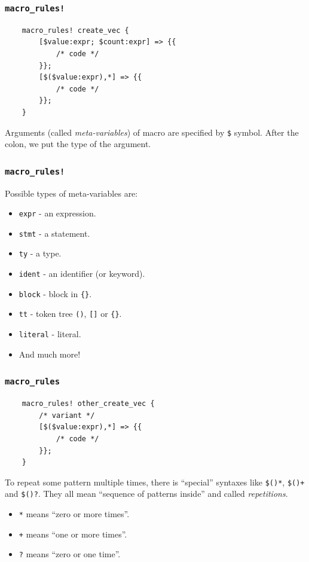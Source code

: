 \documentclass[aspectratio=1610,t]{beamer}
\begin{document}
\begin{frame}[fragile]
\frametitle{\texttt{macro\_rules!}}
\begin{verbatim}
    macro_rules! create_vec {
        [$value:expr; $count:expr] => {{
            /* code */
        }};
        [$($value:expr),*] => {{
            /* code */
        }};
    }
\end{verbatim}

Arguments (called \textit{meta-variables}) of macro are specified by \texttt{\$} symbol. After the colon, we put the type of the argument.
\end{frame}


\begin{frame}[fragile]
\frametitle{\texttt{macro\_rules!}}
Possible types of meta-variables are:

\begin{itemize}
    \item \texttt{expr} - an expression.
    \item \texttt{stmt} - a statement.
    \item \texttt{ty} - a type.
    \item \texttt{ident} - an identifier (or keyword).
    \item \texttt{block} - block in \texttt{\{\}}.
    \item \texttt{tt} - token tree \texttt{()}, \texttt{[]} or \texttt{\{\}}.
    \item \texttt{literal} - literal.
    \item And much more!
\end{itemize}
\end{frame}


\begin{frame}[fragile,c]
\frametitle{\texttt{macro\_rules}}
\begin{verbatim}
    macro_rules! other_create_vec {
        /* variant */
        [$($value:expr),*] => {{
            /* code */
        }};
    }
\end{verbatim}

To repeat some pattern multiple times, there is ``special'' syntaxes like \texttt{\$()*}, \texttt{\$()+} and \texttt{\$()?}. They all mean ``sequence of patterns inside'' and called \textit{repetitions}.

\begin{itemize}
    \item \texttt{*} means ``zero or more times''.
    \item \texttt{+} means ``one or more times''.
    \item \texttt{?} means ``zero or one time''.
\end{itemize}

\end{frame}
\end{document}
